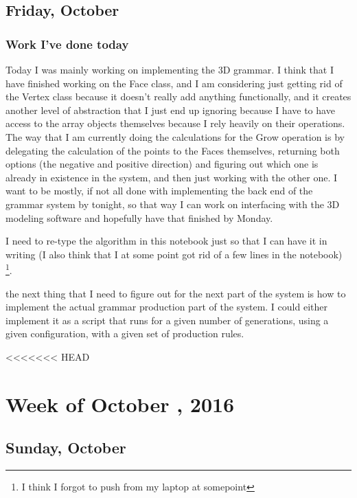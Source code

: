 \documentclass[letterpaper,oneside,titlepage]{article}
\begin{document}
\subsection*{Friday, October }

\subsubsection*{Work I've done today}
Today I was mainly working on implementing the 3D grammar.  I think that I have finished working on the Face class, and I am considering just getting rid of the Vertex class because it doesn't really add anything functionally, and it creates another level of abstraction that I just end up ignoring because I have to have access to the array objects themselves because I rely heavily on their operations.  The way that I am currently doing the calculations for the Grow operation is by delegating the calculation of the points to the Faces themselves, returning both options (the negative and positive direction) and figuring out which one is already in existence in the system, and then just working with the other one.  I want to be mostly, if not all done with implementing the back end of the grammar system by tonight, so that way I can work on interfacing with the 3D modeling software and hopefully have that finished by Monday.
\par
I need to re-type the algorithm in this notebook just so that I can have it in writing (I also think that I at some point got rid of a few lines in the notebook) \footnote{I think I forgot to push from my laptop at somepoint}.
\par
the next thing that I need to figure out for the next part of the system is how to implement the actual grammar production part of the system.  I could either implement it as a script that runs for a given number of generations, using a given configuration, with a given set of production rules.


<<<<<<< HEAD

\section*{Week of October , 2016}

\subsection*{Sunday, October }
\end{document}
